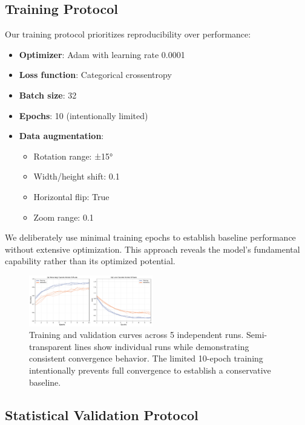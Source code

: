 \documentclass[conference]{IEEEtran}
\begin{document}
\subsection{Training Protocol}

Our training protocol prioritizes reproducibility over performance:

\begin{itemize}
    \item \textbf{Optimizer}: Adam with learning rate 0.0001
    \item \textbf{Loss function}: Categorical crossentropy
    \item \textbf{Batch size}: 32
    \item \textbf{Epochs}: 10 (intentionally limited)
    \item \textbf{Data augmentation}: 
    \begin{itemize}
        \item Rotation range: ±15°
        \item Width/height shift: 0.1
        \item Horizontal flip: True
        \item Zoom range: 0.1
    \end{itemize}
\end{itemize}

We deliberately use minimal training epochs to establish baseline performance without extensive optimization. This approach reveals the model's fundamental capability rather than its optimized potential.

\begin{figure}[H]
\centering
\includegraphics[width=0.48\textwidth]{figures/training_curves.pdf}
\caption{Training and validation curves across 5 independent runs. Semi-transparent lines show individual runs while demonstrating consistent convergence behavior. The limited 10-epoch training intentionally prevents full convergence to establish a conservative baseline.}
\label{fig:training_curves}
\end{figure}

\subsection{Statistical Validation Protocol}
\end{document}
